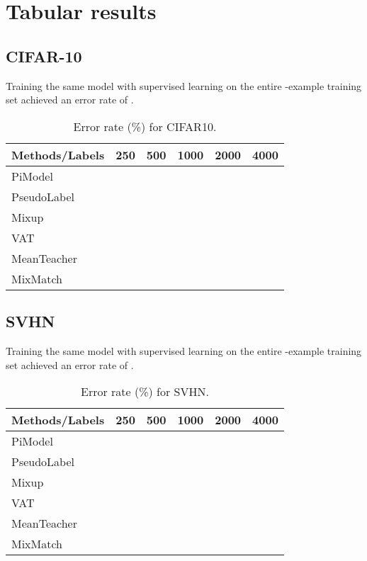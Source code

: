 \documentclass{article}
\begin{document}
\section{Tabular results}
\subsection{CIFAR-10}
Training the same model with supervised learning on the entire -example training set achieved an error rate of .
\begin{table}[H]
\centering
\begin{tabular}{lrrrrr}
\toprule
Methods/Labels & 250 & 500 & 1000 & 2000 & 4000 \\
\midrule
PiModel &  &  &  &  &  \\
PseudoLabel &  &  &  &  &  \\
Mixup &  &  &  &  &  \\
VAT &  &  &  &  &  \\
MeanTeacher &  &  &  &  &  \\
MixMatch &  &  &  &  &  \\
\bottomrule
\end{tabular}
\vskip 0.1in
\caption{Error rate (\%) for CIFAR10.}
\label{tab:cifar10}
\end{table}


\subsection{SVHN}
Training the same model with supervised learning on the entire -example training set achieved an error rate of .
\begin{table}[H]
\centering
\begin{tabular}{lrrrrr}
\toprule
Methods/Labels & 250 & 500 & 1000 & 2000 & 4000 \\
\midrule
PiModel &  &  &  &  &  \\
PseudoLabel &  &  &  &  &  \\
Mixup &  &  &  &  &  \\
VAT &  &  &  &  &  \\
MeanTeacher &  &  &  &  &  \\
MixMatch &  &  &  &  &  \\
\bottomrule
\end{tabular}
\vskip 0.1in
\caption{Error rate (\%) for SVHN.}
\label{tab:svhn}
\end{table}

\newpage
\end{document}
